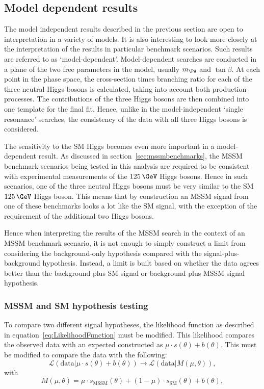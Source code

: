 \subsection{Model dependent results}
\label{sec:modeldependent}

The model independent results described in the previous section are open to
interpretation in a variety of models. It is also interesting to look more
closely at the interpretation of the results in particular benchmark scenarios.
Such results are referred to as `model-dependent'. Model-dependent searches are
conducted in a plane of the two free parameters in the model, usually $m_{\PA}$
and $\tan\beta$. At each point in the phase space, the cross-section times
branching ratio for each of the three neutral Higgs bosons is calculated, taking
into account both production processes. The contributions of the three Higgs
bosons are then combined into one template for the final fit. Hence, unlike in the
model-independent `single resonance' searches, the consistency of the data with
all three Higgs bosons is considered. 

The sensitivity to the \ac{SM} Higgs becomes even more important in a
model-dependent result. As discussed in
section~\ref{sec:mssmbenchmarks}, the \ac{MSSM} benchmark scenarios being tested in this
analysis are required to be consistent with experimental measurements of the
$125\,\GeV$ Higgs bosons. Hence in such scenarios, one of the three neutral Higgs
bosons must be very similar to the \ac{SM} $125\,\GeV$ Higgs boson. This means
that by construction an \ac{MSSM} signal from one of these benchmarks looks a
lot like the \ac{SM} signal, with the exception of the requirement of the
additional two Higgs bosons.

Hence when interpreting the results of the \ac{MSSM} search in the context of an
\ac{MSSM} benchmark scenario, it is not enough to simply construct a limit from
considering the background-only hypothesis compared with the
signal-plus-background hypothesis. Instead, a limit is built based on
whether the data agrees better than the background plus \ac{SM} signal or
background plus \ac{MSSM} signal hypothesis.

\subsubsection{MSSM and SM hypothesis testing}

To compare two different signal hypotheses, the likelihood function as described
in equation~\ref{eq:LikelihoodFunction} must be modified. This likelihood compares 
the observed data with an expected constructed as
$\mu \cdot s(\theta) + b(\theta)$. This must be modified to compare the data with the
following:
\begin{equation}
\mathcal{L}(\text{data} | \mu \cdot s(\theta) + b(\theta)) \rightarrow
\mathcal{L}(\text{data} | M(\mu,\theta)),
\end{equation}
with
\begin{equation}
M(\mu,\theta) = \mu \cdot s_{\text{MSSM}}(\theta) + (1-\mu) \cdot
s_{\text{SM}}(\theta) + b(\theta), 
\end{equation}

